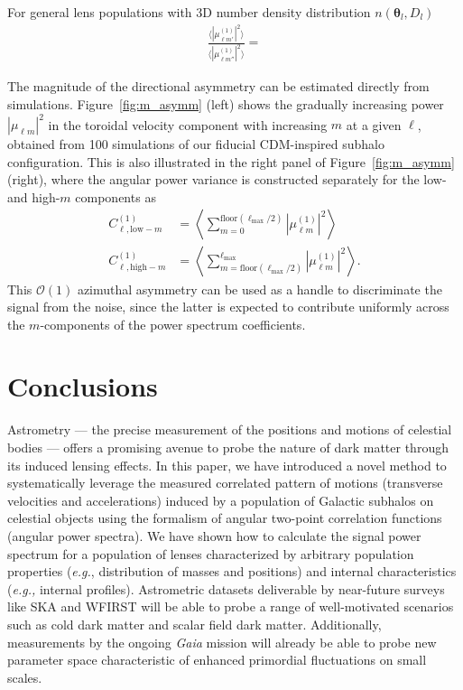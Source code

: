 \documentclass[twocolumn]{aastex63}
\newcommand{\vect}[1]{\boldsymbol{\mathbf{#1}}}
\newcommand{\ellm}{{\ell m}}
\begin{document}
For general lens populations with 3D number density distribution $n(\vect{\theta}_l,D_l)$
\begin{align}
\frac{\langle |\mu_{\ell m'}^{(1)}|^2 \rangle}{\langle |\mu_{\ell m''}^{(1)}|^2 \rangle} = 
\end{align}

The magnitude of the directional asymmetry can be estimated directly from simulations. Figure~\ref{fig:m_asymm} (left) shows the gradually increasing power $|\mu_\ellm|^2$ in the toroidal velocity component with increasing $m$ at a given $\ell$, obtained from 100 simulations of our fiducial CDM-inspired subhalo configuration. This is also illustrated in the right panel of Figure~\ref{fig:m_asymm} (right), where the angular power variance is constructed separately for the low- and high-$m$ components as 
\begin{align}
 C_{\ell,\mathrm{low-}m}^{(1)} &=  \left\langle \sum_{m = 0}^{\mathrm{floor}(\ell_\mathrm{max}/2)} \left| \mu_{\ell m}^{(1)} \right|^2\right\rangle \nonumber \\
 C_{\ell,\mathrm{high-}m}^{(1)} &= \left\langle\sum_{m = {\mathrm{floor}(\ell_\mathrm{max}/2)}}^{\ell_\mathrm{max}} \left| \mu_{\ell m}^{(1)} \right|^2\right\rangle. \label{eq:asymm}
\end{align}
This $\mathcal{O}(1)$ azimuthal asymmetry can be used as a handle to discriminate the signal from the noise, since the latter is expected to contribute uniformly across the $m$-components of the power spectrum coefficients.


\section{Conclusions}
\label{sec:conclusions}

Astrometry --- the precise measurement of the positions and motions of celestial bodies --- offers a promising avenue to probe the nature of dark matter through its induced lensing effects. In this paper, we have introduced a novel method to systematically leverage the measured correlated pattern of motions (transverse velocities and accelerations) induced by a population of Galactic subhalos on celestial objects using the formalism of angular two-point correlation functions (angular power spectra). We have shown how to calculate the signal power spectrum for a population of lenses characterized by arbitrary population properties (\emph{e.g.}, distribution of masses and positions) and internal characteristics (\emph{e.g.,} internal profiles). Astrometric datasets deliverable by near-future surveys like SKA and WFIRST will be able to probe a range of well-motivated scenarios such as cold dark matter and scalar field dark matter. Additionally, measurements by the ongoing \emph{Gaia} mission will already be able to probe new parameter space characteristic of enhanced primordial fluctuations on small scales.
\end{document}
